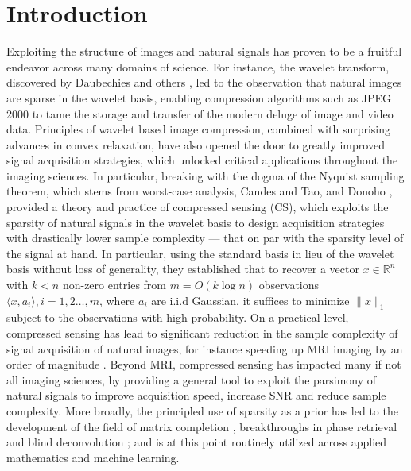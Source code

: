 \documentclass[11pt]{article}
\newcommand{\red}[1]{{\color{black} #1}}
\begin{document}
\section{Introduction}
Exploiting the structure of images and natural signals has proven to be a fruitful endeavor across many domains of science. For instance, the wavelet transform, discovered by Daubechies and others \cite{daubechies1992ten}, led to the observation that natural images are sparse in the wavelet basis, enabling compression algorithms such as JPEG 2000 to tame the storage and transfer of the modern deluge of image and video data.   Principles of wavelet based image compression, combined with surprising advances in convex relaxation, have also opened the door to greatly improved signal acquisition strategies, which unlocked critical applications throughout the imaging sciences.  In particular, breaking with the dogma of the Nyquist sampling theorem, which stems from worst-case analysis, Candes and Tao, and Donoho \cite{CRT2005,Donoho, donoho2009counting}, provided a theory and practice of compressed sensing (CS), which exploits the sparsity of natural signals in the wavelet basis to design acquisition strategies with drastically lower sample complexity --- that on par with the sparsity level of the signal at hand. In particular,  using the standard basis in lieu of the wavelet basis without loss of generality, they established that to recover a vector $x \in \mathbb{R}^n$ with $k < n$ non-zero entries from $m = O(k \log n)$ observations $\langle x, a_i \rangle, i = 1,2\ldots, m$, where $a_i$ are i.i.d Gaussian, it suffices to minimize $\|x\|_1$ subject to the observations with high probability. On a practical level, compressed sensing has lead to significant reduction in the sample complexity of signal acquisition of natural images, for instance speeding up MRI imaging by an order of magnitude \cite{MRM:MRM21391}. Beyond MRI, compressed sensing has impacted many if not all imaging sciences, by providing a general tool to exploit the parsimony of natural signals to improve acquisition speed, increase SNR and reduce sample complexity. More broadly, the principled use of sparsity as a prior has led  to the development of the field of matrix completion \cite{MC}, breakthroughs in phase retrieval \cite{CSV2013, CESV2011} and blind deconvolution \cite{BDC}; and is at this point routinely utilized across applied mathematics and machine learning. %
\end{document}
